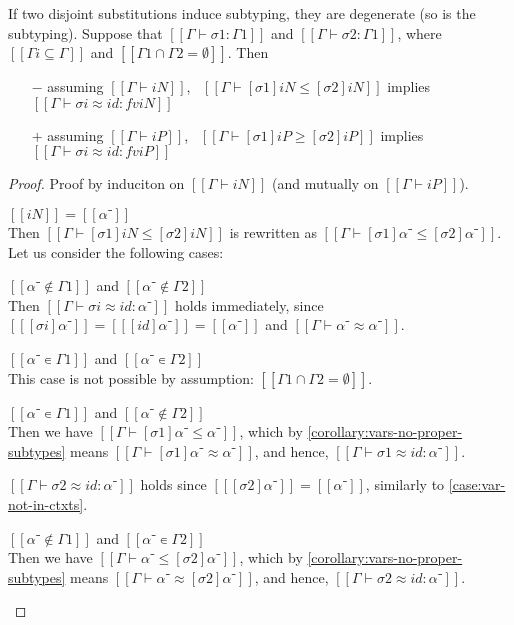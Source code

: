 \begin{lemma}
  \label{lemma:subt-ind-disj-subst}
  If two disjoint substitutions induce subtyping, they are degenerate (so is the
  subtyping).
  Suppose that $[[Γ ⊢ σ1 : Γ1]]$ and $[[Γ ⊢ σ2 : Γ1]]$,
  where $[[Γi ⊆ Γ]]$ and $[[Γ1 ∩ Γ2= ∅]]$. Then
  \begin{itemize}
  \item[$-$] assuming $[[Γ ⊢ iN]]$,~
    $[[Γ ⊢ [σ1]iN ≤ [σ2]iN]]$ implies $[[Γ ⊢ σi ≈ id : fv iN]]$
  \item[$+$] assuming $[[Γ ⊢ iP]]$,~
    $[[Γ ⊢ [σ1]iP ≥ [σ2]iP]]$ implies $[[Γ ⊢ σi ≈ id : fv iP]]$
  \end{itemize}
\end{lemma}
\begin{proof}
  Proof by induciton on $[[Γ ⊢ iN]]$ (and mutually on $[[Γ ⊢ iP]]$).
  \begin{caseof}
    \item $[[iN]] = [[α⁻]]$\\
      Then $[[Γ ⊢ [σ1]iN ≤ [σ2]iN]]$ is rewritten as $[[Γ ⊢ [σ1]α⁻ ≤ [σ2]α⁻]]$.
      Let us consider the following cases:
      \begin{caseof}
      \item $[[α⁻ ∉ Γ1]]$ and $[[α⁻ ∉ Γ2]]$ \label{case:var-not-in-ctxts}\\
        Then $[[Γ ⊢ σi ≈ id : {α⁻}]]$ holds immediately,
        since $[[ [σi] α⁻]] = [[ [id] α⁻]] = [[α⁻]]$ and
        $[[Γ ⊢ α⁻ ≈ α⁻]]$.
      \item $[[α⁻ ∊ Γ1]]$ and $[[α⁻ ∊ Γ2]]$\\
        This case is not possible by assumption: $[[Γ1 ∩ Γ2= ∅]]$.
      \item $[[α⁻ ∊ Γ1]]$ and $[[α⁻ ∉ Γ2]]$\\
        Then we have $[[Γ ⊢ [σ1]α⁻ ≤ α⁻]]$,
        which by \cref{corollary:vars-no-proper-subtypes} means $[[Γ ⊢ [σ1]α⁻ ≈ α⁻]]$,
        and hence, $[[Γ ⊢ σ1 ≈ id : {α⁻}]]$.

        $[[Γ ⊢ σ2 ≈ id : {α⁻}]]$ holds since $[[ [σ2]α⁻ ]] = [[α⁻]]$,
        similarly to \cref{case:var-not-in-ctxts}.

      \item $[[α⁻ ∉ Γ1]]$ and $[[α⁻ ∊ Γ2]]$\\
        Then we have $[[Γ ⊢ α⁻ ≤ [σ2]α⁻]]$,
        which by \cref{corollary:vars-no-proper-subtypes} means $[[Γ ⊢ α⁻ ≈ [σ2]α⁻]]$,
        and hence, $[[Γ ⊢ σ2 ≈ id : {α⁻}]]$.


\end{caseof}
\end{caseof}
\end{proof}
